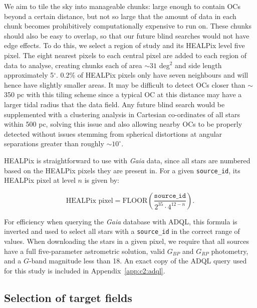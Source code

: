 We aim to tile the sky into manageable chunks: large enough to contain OCs beyond a certain distance, but not so large that the amount of data in each chunk becomes prohibitively computationally expensive to run on. These chunks should also be easy to overlap, so that our future blind searches would not have edge effects. To do this, we select a region of study and its HEALPix level five pixel. The eight nearest pixels to each central pixel are added to each region of data to analyse, creating chunks each of area $\sim 31$ deg$^2$ and side length approximately 5$^\circ$. 0.2\% of HEALPix pixels only have seven neighbours and will hence have slightly smaller areas. It may be difficult to detect OCs closer than $\sim$350 pc with this tiling scheme since a typical OC at this distance may have a larger tidal radius that the data field. Any future blind search would be supplemented with a clustering analysis in Cartesian co-ordinates of all stars within 500 pc, solving this issue and also allowing nearby OCs to be properly detected without issues stemming from spherical distortions at angular separations greater than roughly $\sim10^{\circ}$.

HEALPix is straightforward to use with \emph{Gaia} data, since all stars are numbered based on the HEALPix pixels they are present in. For a given \texttt{source\_id}, its HEALPix pixel at level $n$ is given by:

\begin{equation}\label{c2:eqn:healpix}
    \textrm{HEALPix pixel} = \textrm{FLOOR} \left( \frac{\texttt{source\_id}}{2^{35} \cdot 4^{12-n}}  \right).
\end{equation}

\noindent
For efficiency when querying the \emph{Gaia} database with ADQL, this formula is inverted and used to select all stars with a \texttt{source\_id} in the correct range of values. When downloading the stars in a given pixel, we require that all sources have a full five-parameter astrometric solution, valid $G_{BP}$ and $G_{RP}$ photometry, and a $G$-band magnitude less than 18. An exact copy of the ADQL query used for this study is included in Appendix~\ref{app:c2:adql}.

\subsection{Selection of target fields}

